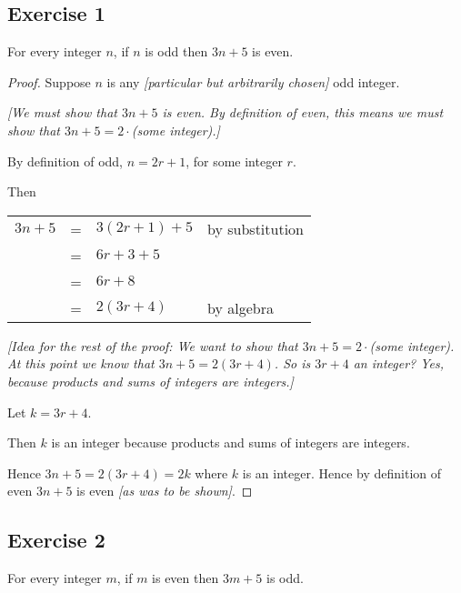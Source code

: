 \documentclass[14pt]{extarticle}
\newcommand{\cy}{\color{cyan}}
\begin{document}
\subsection{Exercise 1}
For every integer $n$, if $n$ is odd then $3n + 5$ is even.

\begin{proof}
    Suppose $n$ is any {\it [particular but arbitrarily chosen]} odd integer.

        {\it [We must show that $3n + 5$ is even. By definition of even, this means we must show that $3n + 5 = 2\cdot$(some integer).]}

    By definition of odd, $n = 2r + 1$, for some integer $r$.

    Then

    \begin{center}
        \begin{tabular}{rcll}
            $3n + 5$ & = & $3(2r + 1) + 5$ & \cy by substitution \\
                     & = & $6r + 3 + 5$    &                     \\
                     & = & $6r + 8$        &                     \\
                     & = & $2(3r + 4)$     & \cy by algebra      \\
        \end{tabular}
    \end{center}

    {\it [Idea for the rest of the proof: We want to show that $3n + 5 = 2\cdot$(some integer). At this point we know that $3n + 5 = 2(3r + 4)$. So is $3r + 4$ an integer? Yes, because products and sums of integers are integers.]}

    Let $k = 3r + 4$.

    Then $k$ is an integer because products and sums of integers are integers.

    Hence $3n + 5 = 2(3r+4) = 2k$ where $k$ is an integer. Hence by definition of even $3n+5$ is even {\it [as was to be shown]}.
\end{proof}

\subsection{Exercise 2}
For every integer $m$, if $m$ is even then $3m + 5$ is odd.
\end{document}
